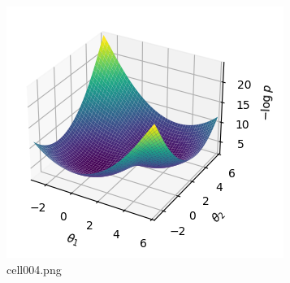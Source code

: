 \begin{figure}[ht]
	\centering
	\includegraphics[scale=0.8, max width=\linewidth]{./fig/bayesian-brain/mcmc/cell004.png}
	\caption{cell004.png}
	\label{cell004.png}
\end{figure}